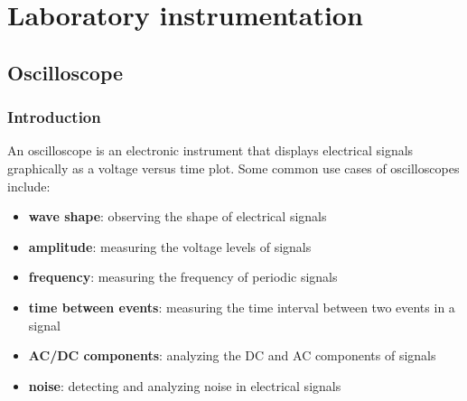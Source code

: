 \section{Laboratory instrumentation}
\subsection{Oscilloscope}
\subsubsection*{Introduction}
An oscilloscope is an electronic instrument that displays electrical signals graphically as a voltage versus time plot. Some common
use cases of oscilloscopes include:
\begin{itemize}
	\item \textbf{wave shape}: observing the shape of electrical signals
	\item \textbf{amplitude}: measuring the voltage levels of signals
	\item \textbf{frequency}: measuring the frequency of periodic signals
	\item \textbf{time between events}: measuring the time interval between two events in a signal
	\item \textbf{AC/DC components}: analyzing the DC and AC components of signals
	\item \textbf{noise}: detecting and analyzing noise in electrical signals
\end{itemize}

